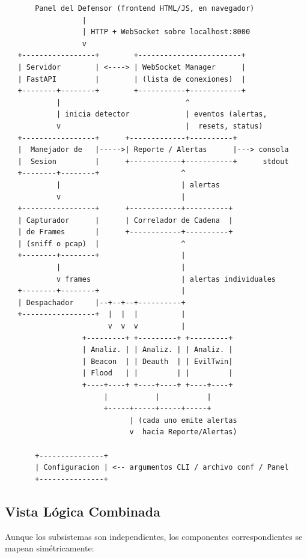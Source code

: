 \documentclass[11pt,a4paper]{article}
\begin{document}
\vspace{0.3cm}
\begin{verbatim}
       Panel del Defensor (frontend HTML/JS, en navegador)
                  |
                  | HTTP + WebSocket sobre localhost:8000
                  v
   +-----------------+        +------------------------+
   | Servidor        | <----> | WebSocket Manager      |
   | FastAPI         |        | (lista de conexiones)  |
   +--------+--------+        +-----------+------------+
            |                             ^
            | inicia detector             | eventos (alertas,
            v                             |  resets, status)
   +-----------------+      +-------------+----------+
   |  Manejador de   |----->| Reporte / Alertas      |---> consola
   |  Sesion         |      +------------+-----------+      stdout
   +--------+--------+                   ^
            |                            | alertas
            v                            |
   +-----------------+      +------------+----------+
   | Capturador      |      | Correlador de Cadena  |
   | de Frames       |      +------------+----------+
   | (sniff o pcap)  |                   ^
   +--------+--------+                   |
            |                            |
            v frames                     | alertas individuales
   +--------+--------+                   |
   | Despachador     |--+--+--+----------+
   +-----------------+  |  |  |          |
                        v  v  v          |
                  +---------+ +---------+ +---------+
                  | Analiz. | | Analiz. | | Analiz. |
                  | Beacon  | | Deauth  | | EvilTwin|
                  | Flood   | |         | |         |
                  +----+----+ +----+----+ +----+----+
                       |           |           |
                       +-----+-----+-----+-----+
                             | (cada uno emite alertas
                             v  hacia Reporte/Alertas)

       +---------------+
       | Configuracion | <-- argumentos CLI / archivo conf / Panel
       +---------------+
\end{verbatim}

\subsection{Vista Lógica Combinada}

Aunque los subsistemas son independientes, los componentes correspondientes
se mapean simétricamente:
\end{document}
